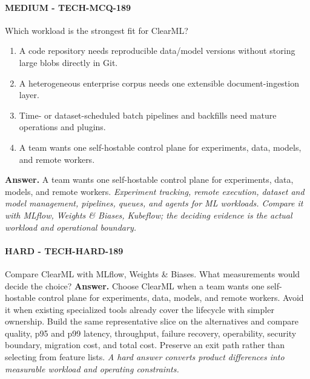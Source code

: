\paragraph{MEDIUM - TECH-MCQ-189} Which workload is the strongest fit for ClearML?
\begin{enumerate}[label=\Alph*.]
\item A code repository needs reproducible data/model versions without storing large blobs directly in Git.
\item A heterogeneous enterprise corpus needs one extensible document-ingestion layer.
\item Time- or dataset-scheduled batch pipelines and backfills need mature operations and plugins.
\item A team wants one self-hostable control plane for experiments, data, models, and remote workers.
\end{enumerate}
\textbf{Answer.} A team wants one self-hostable control plane for experiments, data, models, and remote workers.
\textit{Experiment tracking, remote execution, dataset and model management, pipelines, queues, and agents for ML workloads. Compare it with MLflow, Weights \& Biases, Kubeflow; the deciding evidence is the actual workload and operational boundary.}
\paragraph{HARD - TECH-HARD-189} Compare ClearML with MLflow, Weights \& Biases. What measurements would decide the choice?
\textbf{Answer.} Choose ClearML when a team wants one self-hostable control plane for experiments, data, models, and remote workers. Avoid it when existing specialized tools already cover the lifecycle with simpler ownership. Build the same representative slice on the alternatives and compare quality, p95 and p99 latency, throughput, failure recovery, operability, security boundary, migration cost, and total cost. Preserve an exit path rather than selecting from feature lists.
\textit{A hard answer converts product differences into measurable workload and operating constraints.}
